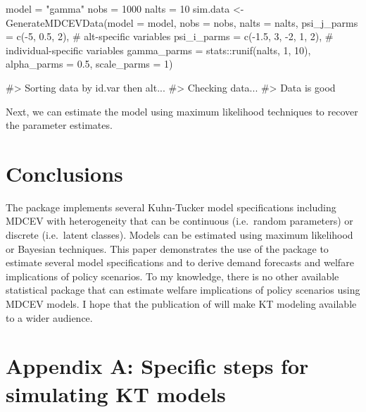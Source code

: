 \begin{example}
model = "gamma" 
nobs = 1000
nalts = 10
sim.data <- GenerateMDCEVData(model = model, 
                  nobs = nobs, 
                  nalts = nalts,
                  psi_j_parms = c(-5, 0.5, 2), # alt-specific variables
                  psi_i_parms = c(-1.5, 3, -2, 1, 2), # individual-specific variables
                  gamma_parms = stats::runif(nalts, 1, 10),
                  alpha_parms = 0.5,
                  scale_parms = 1)

#> Sorting data by id.var then alt...
#> Checking data...
#> Data is good
\end{example}

Next, we can estimate the model using maximum likelihood techniques to
recover the parameter estimates.


\hypertarget{conclusions}{%
\section{Conclusions}\label{conclusions}}

The  package implements several Kuhn-Tucker model
specifications including MDCEV with heterogeneity that can be continuous
(i.e.~random parameters) or discrete (i.e.~latent classes). Models can
be estimated using maximum likelihood or Bayesian techniques. This paper
demonstrates the use of the package to estimate several model
specifications and to derive demand forecasts and welfare implications
of policy scenarios. To my knowledge, there is no other available
statistical package that can estimate welfare implications of policy
scenarios using MDCEV models. I hope that the publication of
 will make KT modeling available to a wider audience.

\hypertarget{appendix-a-specific-steps-for-simulating-kt-models}{%
\section{Appendix A: Specific steps for simulating KT
models}\label{appendix-a-specific-steps-for-simulating-kt-models}}

